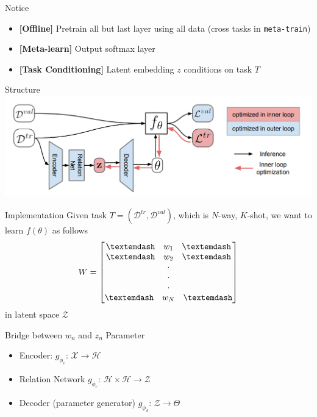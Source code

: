 \documentclass{beamer}
\begin{document}
\begin{frame}{Notice}
  \begin{itemize}
    \item \textbf{[Offline]} Pretrain all but last layer using all data (cross tasks in \texttt{meta-train})
    \item \textbf{[Meta-learn]} Output softmax layer
    \item \textbf{[Task Conditioning]} Latent embedding $z$ conditions on task $T$
  \end{itemize}
\end{frame}

\begin{frame}{Structure}
  \includegraphics[width=\textwidth]{fig/LEO-struct.png}
\end{frame}

\begin{frame}{Implementation}
  Given task $T = (\mathcal{D}^{tr}, \mathcal{D}^{val})$, which is $N$-way, $K$-shot, we want to learn $f(\theta)$ as follows
  \[
    W = \begin{bmatrix}
    \textemdash \quad w_1 \quad \textemdash  \\
    \textemdash \quad w_2 \quad \textemdash \\
    \cdot\\
    \cdot\\
    \cdot\\
    \textemdash \quad w_N \quad \textemdash\\
\end{bmatrix}
\]
\center in latent space $\mathcal{Z}$
\end{frame}

\begin{frame}{Bridge between $w_n$ and $z_n$}
Parameter
\begin{itemize}
  \item Encoder: $g_{\phi_e}$: $\mathcal{X} \rightarrow \mathcal{H}$
  \item Relation Network $g_{\phi_r}$: $\mathcal{H} \times \mathcal{H} \rightarrow \mathcal{Z}$
  \item Decoder (parameter generator) $g_{\phi_d}$: $\mathcal{Z} \rightarrow \Theta$
\end{itemize}
\end{frame}
\end{document}
